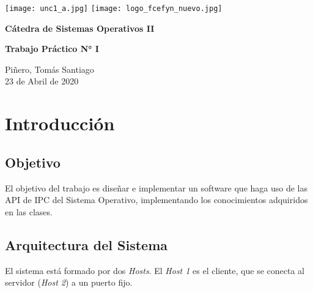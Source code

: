 \documentclass[12pt,a4paper]{article}
\renewcommand{\baselinestretch}{1} %
\begin{document}
\begin{titlepage}
    \begin{center}
      \vspace*{1cm}

      \vspace{2cm}
      \texttt{[image: unc1\_a.jpg]}
      \texttt{[image: logo\_fcefyn\_nuevo.jpg]}

      \Huge
      \textbf{Cátedra de Sistemas Operativos II}

      \vspace{3.5cm}

      \textbf{Trabajo Práctico N\si{\degree} I}

      \vfill

      \vspace{0.8cm}



      \Large
      Piñero, Tomás Santiago\\
      23 de Abril de 2020
    \end{center}
\end{titlepage}

\setcounter{secnumdepth}{1}
\setcounter{tocdepth}{5}
\tableofcontents


\newpage
\renewcommand{\baselinestretch}{1}
\setlength{\parskip}{0.5em}

\section{Introducción}
\label{intro}

\subsection{Objetivo}
\label{objetivo}
El objetivo del trabajo es diseñar e implementar un software que haga uso de las
API de IPC del Sistema Operativo, implementando los conocimientos adquiridos en
las clases.

\subsection{Arquitectura del Sistema}
\label{sistema}
El sistema está formado por dos \emph{Hosts}. El \emph{Host 1} es el cliente,
que se conecta al servidor (\emph{Host 2}) a un puerto fijo.
\end{document}
